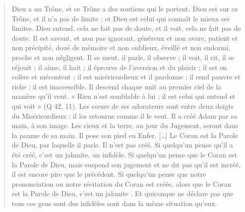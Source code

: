 \begin{quote}
    
Dieu a un Trône, et ce Trône a des soutiens qui le portent. Dieu est sur
ce Trône, et il n'a pas de limite ; et Dieu est celui qui connaît le
mieux ses limites. Dieu entend, cela ne fait pas de doute, et il voit,
cela ne fait pas de doute. Il est savant, et non pas ignorant, généreux
et non avare, patient et non précipité, doué de mémoire et non oublieux,
éveillé et non endormi, proche et non négligent. Il se meut, il parle,
il observe ; il voit, il rit, il se réjouit ; il aime, il hait ; il
éprouve de l'aversion et du plaisir ; il est en colère et mécontent ; il
est miséricordieux et il pardonne ; il rend pauvre et riche ; il est
inaccessible. Il descend chaque nuit au premier ciel de la manière qu'il
veut. « Rien n'est semblable à lui ; il est celui qui entend et qui voit
» (Q 42, 11). Les cœurs de ses adorateurs sont entre deux doigts du
Miséricordieux : il les retourne comme il le veut. Il a créé Adam par sa
main,
à son image. Les cieux et la terre, au jour du Jugement, seront dans la paume de sa main. Il pose son pied en Enfer. […]
Le Coran est la Parole de Dieu, par laquelle il parle. Il n’est pas créé. Si quelqu’un pense qu’il a été créé, c’est un jahmite, un infidèle. Si quelqu’un pense que le Coran est la Parole de Dieu, mais suspend son jugement et ne dit pas qu’il est incréé, il est encore pire que le précédent. Si quelqu’un pense que notre prononciation ou notre récitation du Coran est créée, alors que le Coran est la Parole de Dieu, c’est un jahmite . Et quiconque ne déclare pas que tous ces gens sont des infidèles sont dans la même situation qu’eux.
\end{quote}




